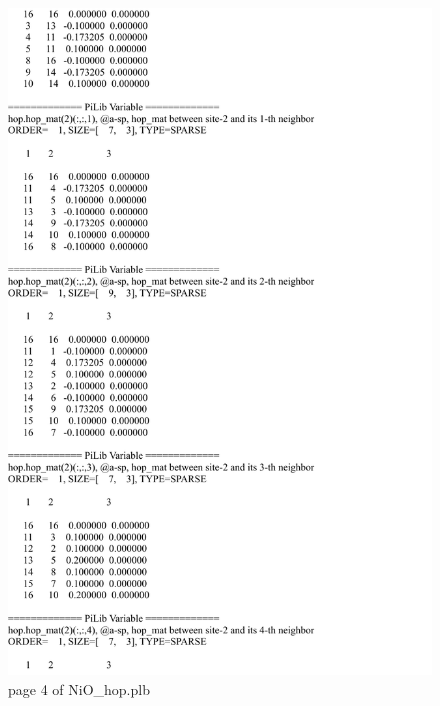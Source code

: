\documentclass[10pt,a4paper]{article}
\begin{document}
\begin{figure}[tbp]
\centering
\includegraphics[width=0.9\columnwidth]{NiO_hop_p4.pdf}
\caption{page 4 of NiO\_hop.plb}
\end{figure}
\end{document}
